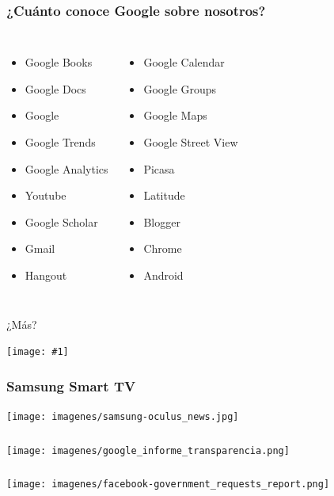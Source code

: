 \documentclass{beamer}
\newcommand{\fullframegraphic}[1]{
\begin{frame}[c]
    \texttt{[image: \#1]}
\end{frame}

}
\begin{document}
\begin{frame}
    \frametitle{¿Cuánto conoce Google sobre nosotros?}
  \begin{columns}
  \begin{itemize}
   \item Google Books \pause
   \item Google Docs  \pause
   \item Google   \pause
   \item Google Trends  \pause
   \item Google Analytics  \pause
   \item Youtube  \pause
   \item Google Scholar  \pause
   \item Gmail  \pause
          \item Hangout  \pause
    \end{itemize}
     \begin{itemize}
       \item Google Calendar  \pause
       \item Google Groups  \pause
       \item Google Maps  \pause
       \item Google Street View  \pause
       \item Picasa  \pause
       \item Latitude  \pause
       \item Blogger  \pause
       \item Chrome  \pause
        \item Android  \pause
         \end{itemize}
  \end{columns}
\begin{center}
  ¿Más?
\end{center}
\end{frame}

\fullframegraphic{imagenes/google_knows.jpeg}

\begin{frame}
  \frametitle{Samsung Smart TV}
 \texttt{[image: imagenes/samsung-oculus\_news.jpg]}
\end{frame}

\begin{frame}
  \frametitle{}
   \texttt{[image: imagenes/google\_informe\_transparencia.png]}
\end{frame}

\begin{frame}
  \frametitle{}
  \texttt{[image: imagenes/facebook-government\_requests\_report.png]}
\end{frame}
\end{document}
